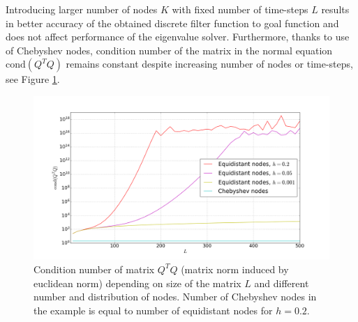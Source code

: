 \documentclass[a4paper,11pt,bibliography=totoc,listof=totoc,headinclude=true,cleardoublepage=empty,oneside]{scrbook}
\begin{document}
Introducing larger number of nodes $K$ with fixed number of time-steps $L$ results in better accuracy of the obtained discrete filter function to goal function and does not affect performance of the eigenvalue solver. Furthermore, thanks to use of Chebyshev nodes, condition number of the matrix in the normal equation $\mathrm{cond}(Q^TQ)$ remains constant despite increasing number of nodes or time-steps, see Figure \ref{fig:least sq cond}.

\begin{figure}[h]
    \centering
    \includegraphics[width=1\linewidth]{latex//images//cheb_least_sq/Figure_3.png}
    \caption{Condition number of matrix $Q^TQ$ (matrix norm induced by euclidean norm) depending on size of the matrix $L$ and different number and distribution of nodes. Number of Chebyshev nodes in the example is equal to number of equidistant nodes for $h=0.2$. }
    \label{fig:least sq cond}
\end{figure}
\end{document}
